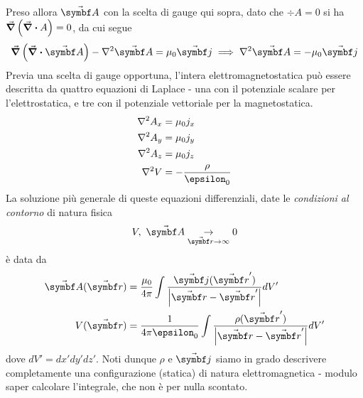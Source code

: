 Preso allora $\vba{A}$ con la scelta di gauge qui sopra, dato che $\div{A}=0$ si ha $\grad{\left(\div{A}\right)}=0$, da cui segue
\begin{equation*}
	\grad \left( \div{\vba{A}}\right) - \laplacian{\vba{A}}=\mu_0 \vba j\implies \laplacian{\vba{A}}=-\mu_0 \vba j
\end{equation*}
Previa una scelta di gauge opportuna, l'intera elettromagnetostatica può essere descritta da quattro equazioni di Laplace - una con il potenziale scalare per l'elettrostatica, e tre con il potenziale vettoriale per la magnetostatica.
\begin{align}
	\laplacian A_x&=\mu_0 j_x\\
	\laplacian A_y&=\mu_0 j_y\\
	\laplacian A_z&=\mu_0 j_z\\
	\laplacian V&=-\frac{\rho}{\epsilon_0}
\end{align}
La soluzione più generale di queste equazioni differenziali, date le \textit{condizioni al contorno} di natura fisica
\begin{equation*}
	V,\ \vba{A}\underset{\vba{r}\to\infty}{\to}0
\end{equation*}
è data da
\begin{align}
	\vba{A}(\vba r)&=\frac{\mu_0}{4\pi}\int\frac{\vba j(\vba r')}{\abs{\vba r-\vba r'}} dV'\\
	V(\vba r)&=\frac{1}{4\pi\epsilon_0}\int \frac{\rho(\vba r')}{\abs{\vba r-\vba r'}}dV'
\end{align}
dove $dV'=dx'dy'dz'$.
Noti dunque $\rho$ e $\vba{j}$ siamo in grado descrivere completamente una configurazione (statica) di natura elettromagnetica - modulo saper calcolare l'integrale, che non è per nulla scontato.
